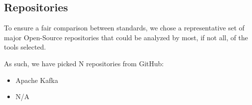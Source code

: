 \subsection{Repositories} \label{methodology:repositories}

To ensure a fair comparison between standards, we chose a representative set of major Open-Source repositories that could be analyzed by most, if not all, of the tools selected.

As such, we have picked N repositories from GitHub:

\begin{itemize}
    \item Apache Kafka \cite{repository:dataset:kafka}
    \item N/A
\end{itemize}